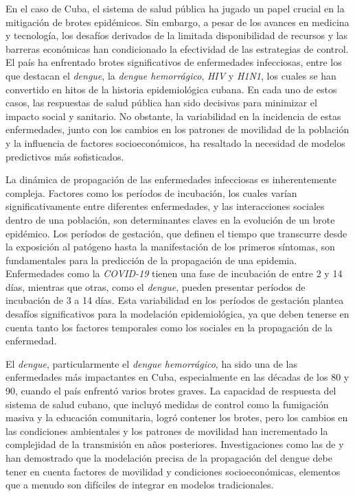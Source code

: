 En el caso de Cuba, el sistema de salud pública ha jugado un papel crucial en la mitigación de brotes epidémicos. Sin embargo, a pesar de los avances en medicina y tecnología, los desafíos derivados de la limitada disponibilidad de recursos y las barreras económicas han condicionado la efectividad de las estrategias de control. El país ha enfrentado brotes significativos de enfermedades infecciosas, entre los que destacan el \textit{dengue}, la \textit{dengue hemorrágico}, \textit{HIV} y \textit{H1N1}, los cuales se han convertido en hitos de la historia epidemiológica cubana. En cada uno de estos casos, las respuestas de salud pública han sido decisivas para minimizar el impacto social y sanitario. No obstante, la variabilidad en la incidencia de estas enfermedades, junto con los cambios en los patrones de movilidad de la población y la influencia de factores socioeconómicos, ha resaltado la necesidad de modelos predictivos más sofisticados.


La dinámica de propagación de las enfermedades infecciosas es inherentemente compleja. Factores como los períodos de incubación, los cuales varían significativamente entre diferentes enfermedades, y las interacciones sociales dentro de una población, son determinantes claves en la evolución de un brote epidémico. Los períodos de gestación, que definen el tiempo que transcurre desde la exposición al patógeno hasta la manifestación de los primeros síntomas, son fundamentales para la predicción de la propagación de una epidemia. Enfermedades como la \textit{COVID-19} tienen una fase de incubación de entre 2 y 14 días, mientras que otras, como el \textit{dengue}, pueden presentar períodos de incubación de 3 a 14 días. Esta variabilidad en los períodos de gestación plantea desafíos significativos para la modelación epidemiológica, ya que deben tenerse en cuenta tanto los factores temporales como los sociales en la propagación de la enfermedad.


El \textit{dengue}, particularmente el \textit{dengue hemorrágico}, ha sido una de las enfermedades más impactantes en Cuba, especialmente en las décadas de los 80 y 90, cuando el país enfrentó varios brotes graves. La capacidad de respuesta del sistema de salud cubano, que incluyó medidas de control como la fumigación masiva y la educación comunitaria, logró contener los brotes, pero los cambios en las condiciones ambientales y los patrones de movilidad han incrementado la complejidad de la transmisión en años posteriores. Investigaciones como las de \textcite{valdes2002impacto} y \textcite{kouri1986dengue} han demostrado que la modelación precisa de la propagación del dengue debe tener en cuenta factores de movilidad y condiciones socioeconómicas, elementos que a menudo son difíciles de integrar en modelos tradicionales.


